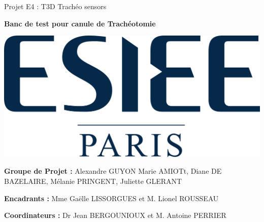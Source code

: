 \documentclass [11pt]{article}
\begin{document}
\begin{titlepage}
   \centering
\vspace{1cm}
\LARGE  Projet E4 : T3D Trachéo sensors \linebreak
\vspace{1.5cm}

\Huge \textbf {Banc de test pour canule de Trachéotomie}

\vspace{4cm}
\centerline{\includegraphics[scale=0.15]{Logo_ESIEE_Paris.svg.png}}
\vspace{3.5cm}
\Large\textbf{Groupe de Projet :} {Alexandre GUYON Marie AMIOTt, Diane DE BAZELAIRE, Mélanie PRINGENT, Juliette GLERANT}\linebreak

\Large\textbf{Encadrants :} {Mme Gaëlle LISSORGUES et M. Lionel ROUSSEAU}\linebreak

\Large\textbf{Coordinateurs :} {Dr Jean BERGOUNIOUX et M. Antoine PERRIER}\linebreak




\end{titlepage}
\end{document}
